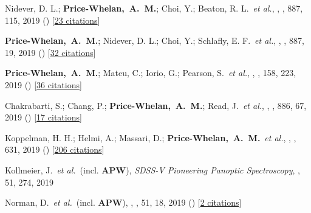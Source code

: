 {\item[{\color{deemph}\scriptsize68}]Nidever, D. L.; \textbf{Price-Whelan,~A.~M.}; Choi, Y.; Beaton, R. L.~\textit{et al.}, , \apj, 887, 115, 2019 () [\href{http://adsabs.harvard.edu/abs/2019ApJ...887..115N}{23 citations}]

\item[{\color{deemph}\scriptsize67}]\textbf{Price-Whelan,~A.~M.}; Nidever, D. L.; Choi, Y.; Schlafly, E. F.~\textit{et al.}, , \apj, 887, 19, 2019 () [\href{http://adsabs.harvard.edu/abs/2019ApJ...887...19P}{32 citations}]

\item[{\color{deemph}\scriptsize66}]\textbf{Price-Whelan,~A.~M.}; Mateu, C.; Iorio, G.; Pearson, S.~\textit{et al.}, , \aj, 158, 223, 2019 () [\href{http://adsabs.harvard.edu/abs/2019AJ....158..223P}{36 citations}]

\item[{\color{deemph}\scriptsize65}]Chakrabarti, S.; Chang, P.; \textbf{Price-Whelan,~A.~M.}; Read, J.~\textit{et al.}, , \apj, 886, 67, 2019 () [\href{http://adsabs.harvard.edu/abs/2019ApJ...886...67C}{17 citations}]

\item[{\color{deemph}\scriptsize64}]Koppelman, H. H.; Helmi, A.; Massari, D.; \textbf{Price-Whelan,~A.~M.}~\textit{et al.}, , \aanda, 631, 2019 () [\href{http://adsabs.harvard.edu/abs/2019A&A...631L...9K}{206 citations}]

\item[{\color{deemph}\scriptsize63}]Kollmeier, J.~\textit{et al.}~(incl. \textbf{APW}), \textit{SDSS-V Pioneering Panoptic Spectroscopy}, \baas, 51, 274, 2019

\item[{\color{deemph}\scriptsize62}]Norman, D.~\textit{et al.}~(incl. \textbf{APW}), , \baas, 51, 18, 2019 () [\href{http://adsabs.harvard.edu/abs/2019BAAS...51g..18N}{2 citations}]

}
